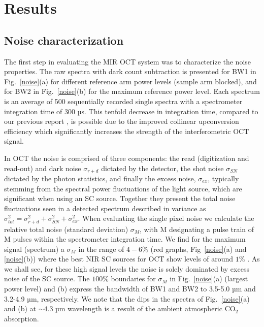 \documentclass[9pt,twocolumn]{extarticle}
\begin{document}
\section{Results}

\subsection{Noise characterization}
The first step in evaluating the MIR OCT system was to characterize the noise properties. The raw spectra with dark count subtraction is presented for BW1 in Fig.~\ref{noise}(a) for different reference arm power levels (sample arm blocked), and for BW2 in Fig.~\ref{noise}(b) for the maximum reference power level. Each spectrum is an average of 500 sequentially recorded single spectra with a spectrometer integration time of 300 µs. This tenfold decrease in integration time, compared to our previous report \cite{israelsen2019real}, is possible due to the improved collinear upconversion efficiency which significantly increases the strength of the interferometric OCT signal. 

\indent In OCT the noise is comprised of three components: the read (digitization and read-out) and dark noise $\sigma_{r+d}$ dictated by the detector, the shot noise $\sigma_{SN}$ dictated by the photon statistics, and finally the excess noise, $\sigma_{ex}$, typically stemming from the spectral power fluctuations of the light source, which are significant when using an SC source. Together they present the total noise fluctuations seen in a detected spectrum described in variance as $\sigma^2_{tot}= \sigma_{r+d}^2+\sigma_{SN}^2+\sigma_{ex}^2$. When evaluating the single pixel noise we calculate the relative total noise (standard deviation) $\sigma_{M}$, with M designating a pulse train of M pulses within the spectrometer integration time. We find for the maximum signal (spectrum) a $\sigma_{M}$ in the range of $4-6\%$ (red graphs, Fig~\ref{noise}(a) and \ref{noise}(b)) where the best NIR SC sources for OCT show levels of around $1\%$ \cite{jensen2019noise}. As we shall see, for these high signal levels the noise is solely dominated by excess noise of the SC source.  The $100\%$ boundaries for $\sigma_M$ in Fig.~\ref{noise}(a) (largest power level) and (b) express the bandwidth of BW1 and BW2 to 3.5-5.0 µm and 3.2-4.9 µm, respectively. We note that the dips in the spectra of Fig.~\ref{noise}(a) and (b) at $\sim 4.3$ µm wavelength is a result of the ambient atmospheric CO$_2$ absorption.
\end{document}
